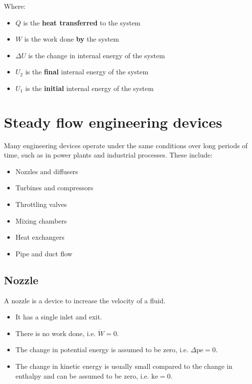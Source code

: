 \documentclass[11pt]{article}
\begin{document}
Where:
\begin{itemize}
\item \(Q\) is the \textbf{heat transferred} to the system
\item \(W\) is the work done \textbf{by} the system
\item \(\Delta U\) is the change in internal energy of the system
\item \(U_2\) is the \textbf{final} internal energy of the system
\item \(U_1\) is the \textbf{initial} internal energy of the system
\end{itemize}


\section{Steady flow engineering devices}
\label{sec:org4fa2dd0}
Many engineering devices operate under the same conditions over long periods of time, such as in power plants and industrial processes. These include:
\begin{itemize}
\item Nozzles and diffusers
\item Turbines and compressors
\item Throttling valves
\item Mixing chambers
\item Heat exchangers
\item Pipe and duct flow
\end{itemize}

\subsection{Nozzle}
\label{sec:org9ee2402}
A nozzle is a device to increase the velocity of a fluid.
\begin{itemize}
\item It has a single inlet and exit.
\item There is no work done, i.e. \(\dot{W} = 0\).
\item The change in potential energy is assumed to be zero, i.e. \(\Delta \text{pe} = 0\).
\item The change in kinetic energy is usually small compared to the change in enthalpy and can be assumed to be zero, i.e. \(\text{ke} = 0\).
\end{itemize}
\end{document}
